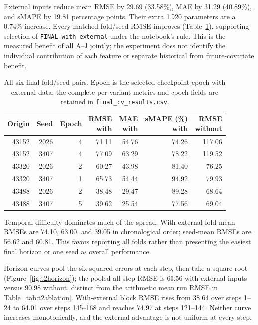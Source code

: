 \documentclass[11pt,a4paper]{article}
\begin{document}
External inputs reduce mean RMSE by 29.69 (33.58\%), MAE by 31.29 (40.89\%), and sMAPE by 19.81 percentage points. Their extra 1,920 parameters are a 0.74\% increase. Every matched fold/seed RMSE improves (Table~\ref{tab:t2folds}), supporting selection of \texttt{FINAL\_with\_external} under the notebook's rule. This is the measured benefit of all A--J jointly; the experiment does not identify the individual contribution of each feature or separate historical from future-covariate benefit.

\begin{table}[htbp]
\centering\small
\caption{All six final fold/seed pairs. Epoch is the selected checkpoint epoch with external data; the complete per-variant metrics and epoch fields are retained in \texttt{final\_cv\_results.csv}.}\label{tab:t2folds}
\begin{tabular}{rrrrrrr}
\toprule
Origin & Seed & Epoch & \shortstack{RMSE\\with} & \shortstack{MAE\\with} & \shortstack{sMAPE (\%)\\with} & \shortstack{RMSE\\without}\\
\midrule
43152 & 2026 & 4 & 71.11 & 54.76 & 74.26 & 117.06 \\
43152 & 3407 & 4 & 77.09 & 63.29 & 78.22 & 119.52 \\
43320 & 2026 & 2 & 60.27 & 43.98 & 81.40 & 76.25 \\
43320 & 3407 & 1 & 65.73 & 54.44 & 94.92 & 79.93 \\
43488 & 2026 & 2 & 38.48 & 29.47 & 89.28 & 68.64 \\
43488 & 3407 & 5 & 39.62 & 25.54 & 77.56 & 69.04 \\
\bottomrule
\end{tabular}
\end{table}

Temporal difficulty dominates much of the spread. With-external fold-mean RMSEs are 74.10, 63.00, and 39.05 in chronological order; seed-mean RMSEs are 56.62 and 60.81. This favors reporting all folds rather than presenting the easiest final horizon or one seed as overall performance.

Horizon curves pool the six squared errors at each step, then take a square root (Figure~\ref{fig:t2horizon}); the pooled all-step RMSE is 60.56 with external inputs versus 90.98 without, distinct from the arithmetic mean run RMSE in Table~\ref{tab:t2ablation}. With-external block RMSE rises from 38.64 over steps 1--24 to 64.01 over steps 145--168 and reaches 74.97 at steps 121--144. Neither curve increases monotonically, and the external advantage is not uniform at every step.
\end{document}
